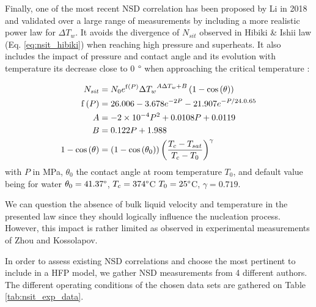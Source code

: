 \npar

Finally, one of the most recent NSD correlation has been proposed by Li \etal in 2018 \cite{li_new_2018} and validated over a large range of measurements by including a more realistic power law for $\Delta T_{w}$. It avoids the divergence of $N_{sit}$ observed in Hibiki \& Ishii law (Eq. \ref{eq:nsit_hibiki}) when reaching high pressure and superheats. It also includes the impact of pressure and contact angle and its evolution with temperature \eg its decrease close to 0 $\degree$ when approaching the critical temperature \cite{song_fan_contact_angle}:


\begin{align}
N_{sit} &= N_{0}e^{\mathrm{f}\parth{P}} {\Delta T_{w}}^{A\Delta T_{w} + B} \parth{1- \cos{\theta}}
\label{eq:nsit_li}\\
%
\mathrm{f}\parth{P} &= 26.006 - 3.678 e^{-2P} - 21.907e^{-P / 24.0.65}\\
%
A &= -2\times 10^{-4} P^{2} + 0.0108P + 0.0119\\
%
B &= 0.122P +1.988\\
%
1-\cos{\theta} &= \parth{1-\cos{\theta_{0}}}\parth{\frac{T_{c}-T_{sat}}{T_{c}-T_{0}}}^{\gamma}
\end{align}
with $P$ in MPa, $\theta_{0}$ the contact angle at room temperature $T_{0}$, and default value being for water $\theta_{0}=41.37 \degree$, $T_{c}=374 \degree$C $T_{0}=25\degree$C, $\gamma = 0.719$.

\begin{remark*}{}
We can question the absence of bulk liquid velocity and temperature in the presented law since they should logically influence the nucleation process. However, this impact is rather limited as observed in experimental measurements of Zhou \etal and Kossolapov.
\end{remark*}

\npar

In order to assess existing NSD correlations and choose the most pertinent to include in a HFP model, we gather NSD measurements from 4 different authors. The different operating conditions of the chosen data sets are gathered on Table \ref{tab:nsit_exp_data}.


